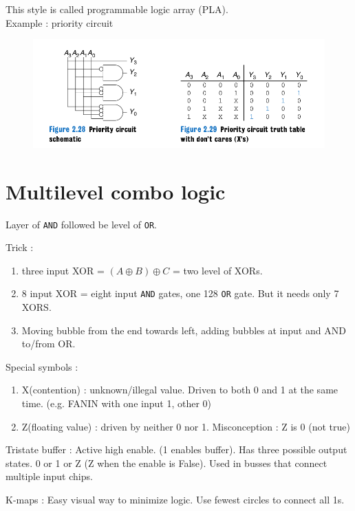 \documentclass{article}[12pt]
\begin{document}
This style is called programmable logic array (PLA). \\ 
Example : priority circuit 
\begin{figure}[htbp]
\centerline{\includegraphics[scale = 0.3]{../Images/priority.png}}
\end{figure}

\section{Multilevel combo logic}
Layer of \verb|AND| followed be level of \verb|OR|. 

Trick : 
\begin{enumerate}
  \item three input XOR = $(A \oplus B) \oplus C$  = two level of XORs.
  \item 8 input XOR = eight input \verb|AND| gates, one 128 \verb|OR| gate. But it needs only 7 XORS.
  \item Moving bubble from the end towards left, adding bubbles at input and AND to/from OR.
\end{enumerate}

Special symbols : 
\begin{enumerate}
  \item X(contention) : unknown/illegal value. Driven to both 0 and 1 at the same time. (e.g. FANIN with one input 1, other 0)
  \item Z(floating value) : driven by neither 0 nor 1. Misconception : Z is 0 (not true)
\end{enumerate}

Tristate buffer : Active high enable. (1 enables buffer). Has three possible output states. 0 or 1 or Z (Z when the enable is False).
Used in busses that connect multiple input chips.

K-maps : Easy visual way to minimize logic. Use fewest circles to connect all 1s.
\end{document}
